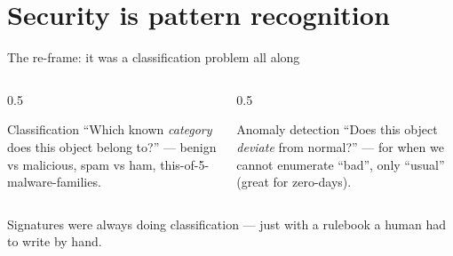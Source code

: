 \documentclass[aspectratio=169,10pt]{beamer}
\newcommand{\term}[1]{{\color{mlink}\textbf{#1}}}         %
\begin{document}
\section{Security is pattern recognition}

\begin{frame}{The re-frame: it was a classification problem all along}
  \centering
  \vfill
  \begin{columns}[T]
    \begin{column}{0.5\textwidth}
      \begin{block}{\small Classification}
        \small ``Which known \emph{category} does this object belong to?''
        --- benign vs malicious, spam vs ham, this-of-5-malware-families.
      \end{block}
    \end{column}
    \begin{column}{0.5\textwidth}
      \begin{block}{\small Anomaly detection}
        \small ``Does this object \emph{deviate} from normal?'' --- for when we
        cannot enumerate ``bad'', only ``usual'' (great for zero-days).
      \end{block}
    \end{column}
  \end{columns}
  \vfill
  {\footnotesize\color{midgray}Signatures were always doing classification ---
  just with a rulebook a human had to write by hand.}
\end{frame}
\end{document}
